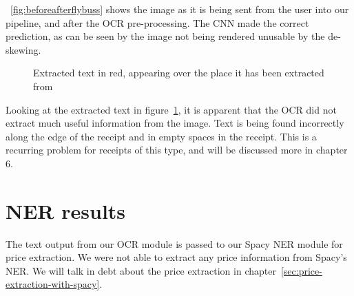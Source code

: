 \clearpage

\figurename{~\ref{fig:beforeafterflybuss}} shows the image as it is being sent from the user into our pipeline, and
after the OCR pre-processing.
The CNN made the correct prediction, as can be seen by the image not being rendered unusable by the de-skewing.

\begin{figure}[h]
    \caption{Extracted text in red, appearing over the place it has been extracted from}
    \label{fig:resultflybuss}
\end{figure}

Looking at the extracted text in figure~\ref{fig:resultflybuss}, it is apparent that the OCR did not
extract much useful information from the image.
Text is being found incorrectly along the edge of the receipt and in empty spaces in the receipt.
This is a recurring problem for receipts of this type, and will be discussed more in chapter 6.

\section{NER results}\label{sec:ner-results}
The text output from our OCR module is passed to our Spacy NER module for price extraction.
We were not able to extract any price information from Spacy's NER\@.
We will talk in debt about the price extraction in chapter~\ref{sec:price-extraction-with-spacy}.